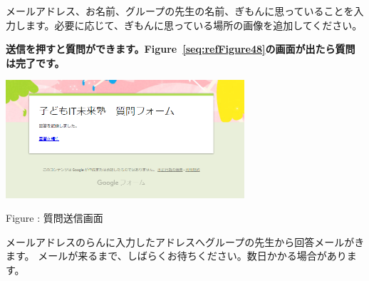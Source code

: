 \documentclass[a4paper,12pt]{jarticle}
\newcounter{Figure}
\renewcommand\theFigure{\arabic{Figure}}
\begin{document}
\bigskip

メールアドレス、お名前、グループの先生の名前、ぎもんに思っていることを入力します。必要に応じて、ぎもんに思っている場所の画像を追加してください。

{\bfseries
送信\textmd{を押すと質問ができます。Figure~\ref{seq:refFigure48}の画面が出たら質問は完了です。}}



\centering
\begin{minipage}{8.871cm}
{\upshape
\includegraphics[width=8.871cm,height=4.374cm]{textbook-img247.png}
\flushleft

\bigskip
Figure {\theFigure\label{seq:refFigure48}}: 質問送信画面}
\end{minipage}
\flushleft
メールアドレスのらんに入力したアドレスへグループの先生から回答メールがきます。
メールが来るまで、しばらくお待ちください。数日かかる場合があります。
\end{document}
